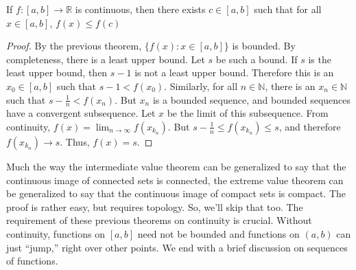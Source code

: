 \documentclass[crop=false,class=book,oneside]{standalone}
\begin{document}
            \begin{theorem}
                    If $f:[a,b]\rightarrow\mathbb{R}$ is
                    continuous, then there exists $c\in[a,b]$
                    such that for all $x\in[a,b]$,
                    $f(x)\leq{f(c)}$
                \end{theorem}
            \begin{proof}
                    By the previous theorem,
                    $\{f(x):x\in[a,b]\}$ is bounded.
                    By completeness, there is a least upper
                    bound. Let $s$ be such
                    a bound. If $s$ is the least upper bound,
                    then $s-1$ is not a least upper bound.
                    Therefore this is an $x_{0}\in[a,b]$ such
                    that $s-1<f(x_{0})$. Similarly,
                    for all $n\in\mathbb{N}$, there is an
                    $x_{n}\in\mathbb{N}$ such that
                    $s-\frac{1}{n}<f(x_{n})$. But $x_{n}$
                    is a bounded sequence, and bounded
                    sequences have a convergent subsequence.
                    Let $x$ be the limit of this subsequence.
                    From continuity,
                    $f(x)=\lim_{n\rightarrow\infty}f(x_{k_{n}})$.
                    But $s-\frac{1}{n}\leq{f(x_{k_{n}})}\leq{s}$,
                    and therefore $f(x_{k_{n}})\rightarrow{s}$.
                    Thus, $f(x)=s$.
                \end{proof}
            Much the way the intermediate value theorem can be
            generalized to say that the continuous image of
            connected sets is connected, the extreme value
            theorem can be generalized to say that the
            continuous image of compact sets is compact.
            The proof is rather easy, but requires
            topology. So, we'll skip that too.
            The requirement of these previous theorems on
            continuity is crucial. Without continuity, functions
            on $[a,b]$ need not be bounded and functions on
            $(a,b)$ can just ``jump,'' right over other points.
            We end with a brief discussion on sequences of
            functions.
\end{document}
